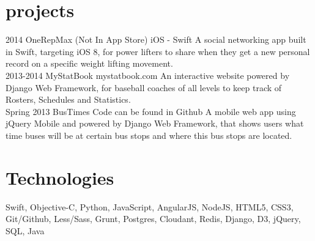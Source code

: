 \documentclass[]{friggeri-cv} %
\begin{document}

\section{projects}

\begin{entrylist}
\entry
{2014}
{OneRepMax (Not In App Store)}
{iOS - Swift}
{A social networking app built in Swift, targeting iOS 8, for power lifters to share when they get a new personal record on a specific weight lifting movement.}\\

\entry
{2013-2014}
{MyStatBook}
{mystatbook.com}
{An interactive website powered by Django Web Framework, for baseball coaches of all levels to keep track of Rosters, Schedules and Statistics.}\\

\entry
{Spring 2013}
{BusTimes}
{Code can be found in Github}
{A mobile web app using jQuery Mobile and powered by Django Web Framework, that shows users what time buses will be at certain bus stops and where this bus stops are located.}

\end{entrylist}


\section{Technologies}

Swift, Objective-C, Python, JavaScript, AngularJS, NodeJS, HTML5, CSS3, Git/Github, Less/Sass, Grunt, Postgres, Cloudant, Redis, Django, D3, jQuery, SQL, Java
\end{document}
